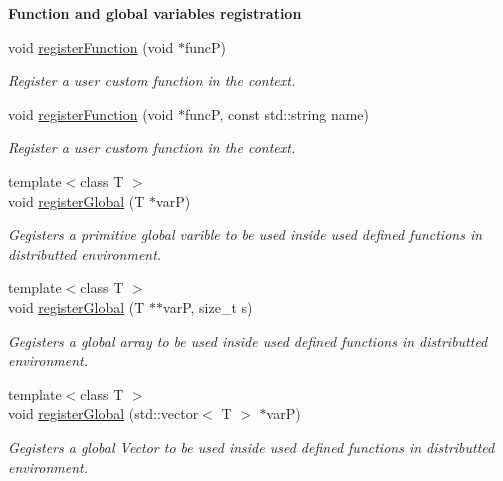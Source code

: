 \begin{Indent}{\bf Function and global variables registration}\par
\begin{DoxyCompactItemize}
\item 
void \hyperlink{classfaster_1_1fastContext_a78d8eec46a44c600adb554bcdf8d8a2c}{register\+Function} (void $\ast$funcP)
\begin{DoxyCompactList}\small\item\em Register a user custom function in the context. \end{DoxyCompactList}\item 
void \hyperlink{classfaster_1_1fastContext_add296b9632bef0f4ceddbdc02a874bb4}{register\+Function} (void $\ast$funcP, const std\+::string name)
\begin{DoxyCompactList}\small\item\em Register a user custom function in the context. \end{DoxyCompactList}\item 
{\footnotesize template$<$class T $>$ }\\void \hyperlink{classfaster_1_1fastContext_a21c563c0ba6075a6dc31faf14dccb165}{register\+Global} (T $\ast$varP)
\begin{DoxyCompactList}\small\item\em Gegisters a primitive global varible to be used inside used defined functions in distributted environment. \end{DoxyCompactList}\item 
{\footnotesize template$<$class T $>$ }\\void \hyperlink{classfaster_1_1fastContext_a569dc3296b036b0d159a35fd7eb37cbe}{register\+Global} (T $\ast$$\ast$varP, size\+\_\+t s)
\begin{DoxyCompactList}\small\item\em Gegisters a global array to be used inside used defined functions in distributted environment. \end{DoxyCompactList}\item 
{\footnotesize template$<$class T $>$ }\\void \hyperlink{classfaster_1_1fastContext_a9cfc7e3b62baca68c7c5a1ddba548691}{register\+Global} (std\+::vector$<$ T $>$ $\ast$varP)
\begin{DoxyCompactList}\small\item\em Gegisters a global Vector to be used inside used defined functions in distributted environment. \end{DoxyCompactList}\end{DoxyCompactItemize}
\end{Indent}
